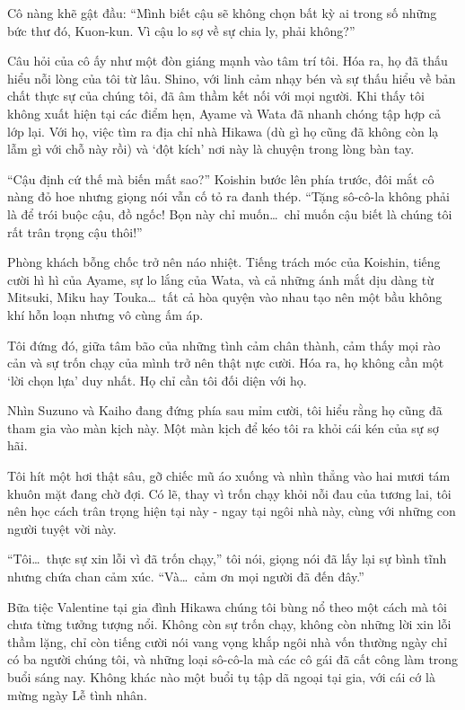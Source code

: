 \documentclass[../main.tex]{subfiles}
\begin{document}
Cô nàng khẽ gật đầu: ``Mình biết cậu sẽ không chọn bất kỳ ai trong số những bức thư đó, Kuon-kun. Vì cậu lo sợ về sự chia ly, phải không?''

Câu hỏi của cô ấy như một đòn giáng mạnh vào tâm trí tôi. Hóa ra, họ đã thấu hiểu nỗi lòng của tôi từ lâu. Shino, với linh cảm nhạy bén và sự thấu hiểu về bản chất thực sự của chúng tôi, đã âm thầm kết nối với mọi người. Khi thấy tôi không xuất hiện tại các điểm hẹn, Ayame và Wata đã nhanh chóng tập hợp cả lớp lại. Với họ, việc tìm ra địa chỉ nhà Hikawa (dù gì họ cũng đã không còn lạ lẫm gì với chỗ này rồi) và `đột kích' nơi này là chuyện trong lòng bàn tay.

``Cậu định cứ thế mà biến mất sao?'' Koishin bước lên phía trước, đôi mắt cô nàng đỏ hoe nhưng giọng nói vẫn cố tỏ ra đanh thép. ``Tặng sô-cô-la không phải là để trói buộc cậu, đồ ngốc! Bọn này chỉ muốn\dots\ chỉ muốn cậu biết là chúng tôi rất trân trọng cậu thôi!''

Phòng khách bỗng chốc trở nên náo nhiệt. Tiếng trách móc của Koishin, tiếng cười hì hì của Ayame, sự lo lắng của Wata, và cả những ánh mắt dịu dàng từ Mitsuki, Miku hay Touka\dots\ tất cả hòa quyện vào nhau tạo nên một bầu không khí hỗn loạn nhưng vô cùng ấm áp.

Tôi đứng đó, giữa tâm bão của những tình cảm chân thành, cảm thấy mọi rào cản và sự trốn chạy của mình trở nên thật nực cười. Hóa ra, họ không cần một `lời chọn lựa' duy nhất. Họ chỉ cần tôi đối diện với họ.

Nhìn Suzuno và Kaiho đang đứng phía sau mỉm cười, tôi hiểu rằng họ cũng đã tham gia vào màn kịch này. Một màn kịch để kéo tôi ra khỏi cái kén của sự sợ hãi.

Tôi hít một hơi thật sâu, gỡ chiếc mũ áo xuống và nhìn thẳng vào hai mươi tám khuôn mặt đang chờ đợi. Có lẽ, thay vì trốn chạy khỏi nỗi đau của tương lai, tôi nên học cách trân trọng hiện tại này - ngay tại ngôi nhà này, cùng với những con người tuyệt vời này.

``Tôi\dots\ thực sự xin lỗi vì đã trốn chạy,'' tôi nói, giọng nói đã lấy lại sự bình tĩnh nhưng chứa chan cảm xúc. ``Và\dots\ cảm ơn mọi người đã đến đây.''

\ct

Bữa tiệc Valentine tại gia đình Hikawa chúng tôi bùng nổ theo một cách mà tôi chưa từng tưởng tượng nổi. Không còn sự trốn chạy, không còn những lời xin lỗi thầm lặng, chỉ còn tiếng cười nói vang vọng khắp ngôi nhà vốn thường ngày chỉ có ba người chúng tôi, và những loại sô-cô-la mà các cô gái đã cất công làm trong buổi sáng nay. Không khác nào một buổi tụ tập dã ngoại tại gia, với cái cớ là mừng ngày Lễ tình nhân.
\end{document}
